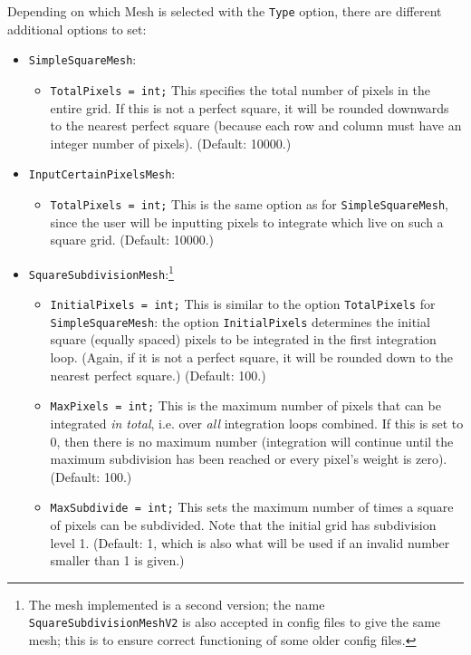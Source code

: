 \documentclass[11pt,a4paper]{article}
\newcommand{\code}[1]{{\tt #1}}
\begin{document}
Depending on which Mesh is selected with the \code{Type} option, there are different additional options to set:
\begin{itemize}
 \item \code{SimpleSquareMesh}:
 \begin{itemize}
 \item \code{TotalPixels = int;}\newline
 This specifies the total number of pixels in the entire grid. If this is not a perfect square, it will be rounded downwards to the nearest perfect square (because each row and column must have an integer number of pixels). (Default: 10000.)
\end{itemize}
\item \code{InputCertainPixelsMesh}:
\begin{itemize}
 \item \code{TotalPixels = int;}\newline
 This is the same option as for \code{SimpleSquareMesh}, since the user will be inputting pixels to integrate which live on such a square grid. (Default: 10000.)
\end{itemize}
\item \code{SquareSubdivisionMesh}:\footnote{The mesh implemented is a second version; the name \code{SquareSubdivisionMeshV2} is also accepted in config files to give the same mesh; this is to ensure correct functioning of some older config files.}
\begin{itemize}
 \item \code{InitialPixels = int;}\newline
 This is similar to the option \code{TotalPixels} for \code{SimpleSquareMesh}: the option \code{InitialPixels} determines the initial square (equally spaced) pixels to be integrated in the first integration loop. (Again, if it is not a perfect square, it will be rounded down to the nearest perfect square.) (Default: 100.)
 \item \code{MaxPixels = int;} \newline
 This is the maximum number of pixels that can be integrated \emph{in total}, i.e. over \emph{all} integration loops combined. If this is set to 0, then there is no maximum number (integration will continue until the maximum subdivision has been reached or every pixel's weight is zero). (Default: 100.)
 \item \code{MaxSubdivide = int;} \newline
 This sets the maximum number of times a square of pixels can be subdivided. Note that the initial grid has subdivision level 1. (Default: 1, which is also what will be used if an invalid number smaller than 1 is given.)
 

\end{itemize}
\end{itemize}
\end{document}
